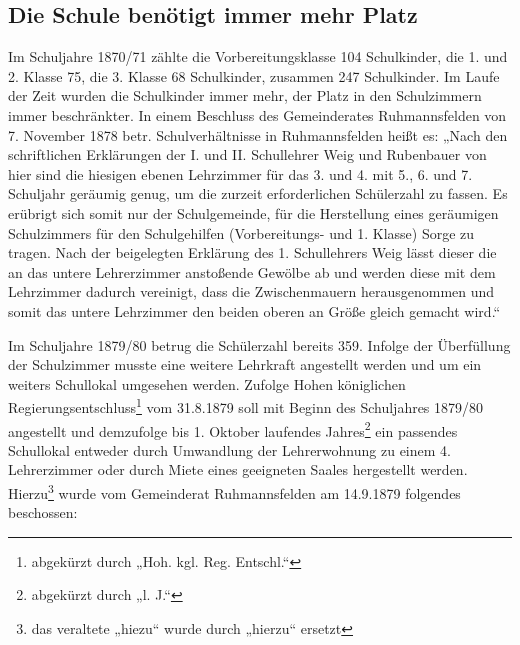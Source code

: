 \documentclass[12pt,a4paper]{book}
\begin{document}
\subsection[Die Schule benötigt immer mehr Platz]{Die Schule benötigt immer mehr
Platz\protect\footnotemark{}\protect{}}

Im Schuljahre 1870/71 zählte die Vorbereitungsklasse 104 Schulkinder, die 1. und
2. Klasse 75, die 3. Klasse 68 Schulkinder, zusammen 247 Schulkinder. Im Laufe
der Zeit wurden die Schulkinder immer mehr, der Platz in den Schulzimmern immer
beschränkter. In einem Beschluss des Gemeinderates Ruhmannsfelden von 7.
November 1878 betr. Schulverhältnisse in Ruhmannsfelden heißt es: „Nach den
schriftlichen Erklärungen der I. und II. Schullehrer Weig und Rubenbauer von
hier sind die hiesigen ebenen Lehrzimmer für das 3. und 4. mit 5., 6. und 7.
Schuljahr geräumig genug, um die zurzeit erforderlichen Schülerzahl zu fassen.
Es erübrigt sich somit nur der Schulgemeinde, für die Herstellung eines
geräumigen Schulzimmers für den Schulgehilfen (Vorbereitungs- und 1. Klasse)
Sorge zu tragen. Nach der beigelegten Erklärung des 1. Schullehrers Weig lässt
dieser die an das untere Lehrerzimmer anstoßende Gewölbe ab und werden diese mit
dem Lehrzimmer dadurch vereinigt, dass die Zwischenmauern herausgenommen und
somit das untere Lehrzimmer den beiden oberen an Größe gleich gemacht wird.“

Im Schuljahre 1879/80 betrug die Schülerzahl bereits 359. Infolge der
Überfüllung der Schulzimmer musste eine weitere Lehrkraft angestellt werden und
um ein weiters Schullokal umgesehen werden. Zufolge Hohen königlichen
Regierungsentschluss\footnote{abgekürzt durch „Hoh. kgl. Reg. Entschl.“} vom
31.8.1879 soll mit Beginn des Schuljahres 1879/80 angestellt und demzufolge bis
1. Oktober laufendes Jahres\footnote{abgekürzt durch „l. J.“} ein passendes
Schullokal entweder durch Umwandlung der Lehrerwohnung zu einem 4. Lehrerzimmer
oder durch Miete eines geeigneten Saales hergestellt werden. Hierzu\footnote{das
veraltete „hiezu“ wurde durch „hierzu“ ersetzt} wurde vom Gemeinderat
Ruhmannsfelden am 14.9.1879 folgendes beschossen:
\end{document}
